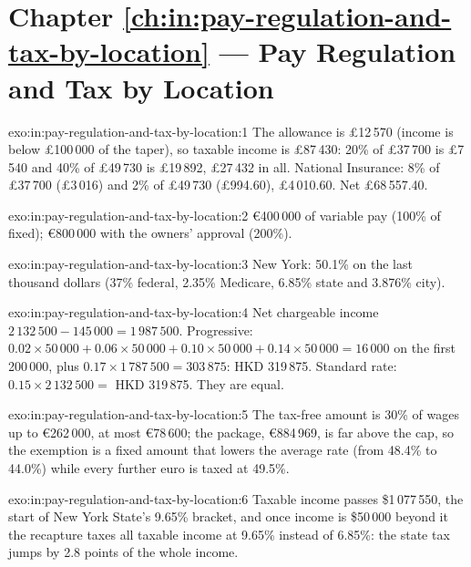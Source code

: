 \section*{Chapter \ref{ch:in:pay-regulation-and-tax-by-location} --- Pay Regulation and Tax by Location}

\begin{solution}{exo:in:pay-regulation-and-tax-by-location:1}
The allowance is \pounds12\,570 (income is below \pounds100\,000 of the taper), so taxable income is \pounds87\,430: 20\% of
\pounds37\,700 is \pounds7\,540 and 40\% of \pounds49\,730 is \pounds19\,892, \pounds27\,432 in all. National Insurance: 8\% of
\pounds37\,700 (\pounds3\,016) and 2\% of \pounds49\,730 (\pounds994.60), \pounds4\,010.60. Net \pounds68\,557.40.
\end{solution}

\begin{solution}{exo:in:pay-regulation-and-tax-by-location:2}
\euro400\,000 of variable pay (100\% of fixed); \euro800\,000 with the owners' approval (200\%).
\end{solution}

\begin{solution}{exo:in:pay-regulation-and-tax-by-location:3}
New York: 50.1\% on the last thousand dollars (37\% federal, 2.35\% Medicare, 6.85\% state and 3.876\% city).
\end{solution}

\begin{solution}{exo:in:pay-regulation-and-tax-by-location:4}
Net chargeable income $2\,132\,500-145\,000=1\,987\,500$. Progressive: $0.02\times50\,000+0.06\times50\,000+0.10\times50\,000
+0.14\times50\,000=16\,000$ on the first 200\,000, plus $0.17\times1\,787\,500=303\,875$: HKD 319\,875. Standard rate:
$0.15\times2\,132\,500=$ HKD 319\,875. They are equal.
\end{solution}

\begin{solution}{exo:in:pay-regulation-and-tax-by-location:5}
The tax-free amount is 30\% of wages up to \euro262\,000, at most \euro78\,600; the package, \euro884\,969, is far above the
cap, so the exemption is a fixed amount that lowers the average rate (from 48.4\% to 44.0\%) while every further euro is
taxed at 49.5\%.
\end{solution}

\begin{solution}{exo:in:pay-regulation-and-tax-by-location:6}
Taxable income passes \$1\,077\,550, the start of New York State's 9.65\% bracket, and once income is \$50\,000 beyond it the
recapture taxes all taxable income at 9.65\% instead of 6.85\%: the state tax jumps by 2.8 points of the whole income.
\end{solution}

